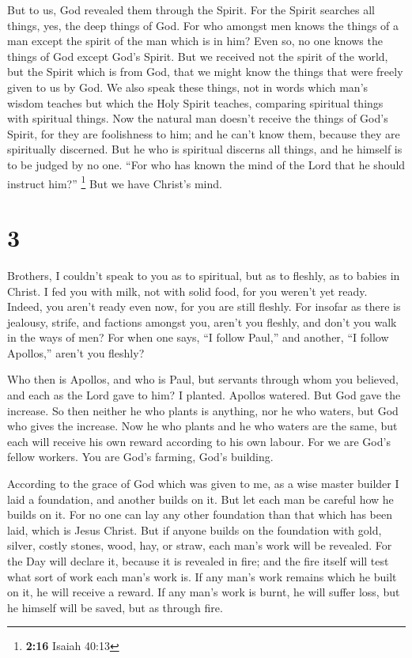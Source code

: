  But to us, God revealed them through the Spirit. For the
Spirit searches all things, yes, the deep things of God. 
For who amongst men knows the things of a man except the spirit of the
man which is in him? Even so, no one knows the things of God except
God's Spirit.  But we received not the spirit of the
world, but the Spirit which is from God, that we might know the things
that were freely given to us by God.  We also speak these
things, not in words which man's wisdom teaches but which the Holy
Spirit teaches, comparing spiritual things with spiritual things.
 Now the natural man doesn't receive the things of God's
Spirit, for they are foolishness to him; and he can't know them, because
they are spiritually discerned.  But he who is spiritual
discerns all things, and he himself is to be judged by no one.
 ``For who has known the mind of the Lord that he should
instruct him?'' \footnote{\textbf{2:16} Isaiah 40:13} But we have
Christ's mind.

\hypertarget{section-2}{%
\section{3}\label{section-2}}

 Brothers, I couldn't speak to you as to spiritual, but as
to fleshly, as to babies in Christ.  I fed you with milk,
not with solid food, for you weren't yet ready. Indeed, you aren't ready
even now,  for you are still fleshly. For insofar as there
is jealousy, strife, and factions amongst you, aren't you fleshly, and
don't you walk in the ways of men?  For when one says, ``I
follow Paul,'' and another, ``I follow Apollos,'' aren't you fleshly?

 Who then is Apollos, and who is Paul, but servants
through whom you believed, and each as the Lord gave to him?
 I planted. Apollos watered. But God gave the increase.
 So then neither he who plants is anything, nor he who
waters, but God who gives the increase.  Now he who plants
and he who waters are the same, but each will receive his own reward
according to his own labour.  For we are God's fellow
workers. You are God's farming, God's building.

 According to the grace of God which was given to me, as
a wise master builder I laid a foundation, and another builds on it. But
let each man be careful how he builds on it.  For no one
can lay any other foundation than that which has been laid, which is
Jesus Christ.  But if anyone builds on the foundation
with gold, silver, costly stones, wood, hay, or straw, 
each man's work will be revealed. For the Day will declare it, because
it is revealed in fire; and the fire itself will test what sort of work
each man's work is.  If any man's work remains which he
built on it, he will receive a reward.  If any man's work
is burnt, he will suffer loss, but he himself will be saved, but as
through fire.

